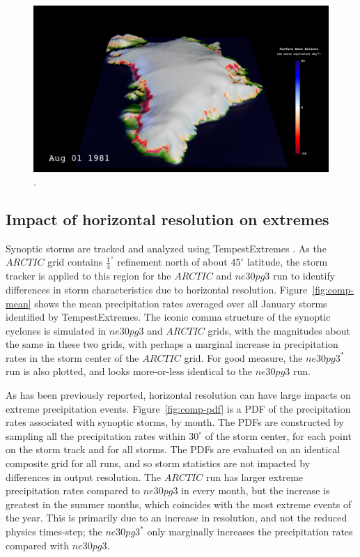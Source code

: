 \documentclass[draft]{agujournal2019}
\begin{document}
\begin{figure}[t]
\begin{center}
         \includegraphics[width=130mm]{figs/Vis1923.jpg}
\end{center}
\caption{.}
\label{fig:viz}
\end{figure}

\subsection{Impact of horizontal resolution on extremes}

Synoptic storms are tracked and analyzed using TempestExtremes \cite{UETAL2021}. As the $ARCTIC$ grid contains $\frac{1}{4}^{\circ}$ refinement north of about $45^{\circ}$ latitude, the storm tracker is applied to this region for the $ARCTIC$ and $ne30pg3$ run to identify differences in storm characteristics due to horizontal resolution. Figure~\ref{fig:comp-mean} shows the mean precipitation rates averaged over all January storms identified by TempestExtremes. The iconic comma structure of the synoptic cyclones is simulated in $ne30pg3$ and $ARCTIC$ grids, with the magnitudes about the same in these two grids, with perhaps a marginal increase in precipitation rates in the storm center of the $ARCTIC$ grid. For good measure, the $ne30pg3^{*}$ run is also plotted, and looks more-or-less identical to the $ne30pg3$ run.

As has been previously reported, horizontal resolution can have large impacts on extreme precipitation events. Figure~\ref{fig:comp-pdf} is a PDF of the precipitation rates associated with synoptic storms, by month. The PDFs are constructed by sampling all the precipitation rates within $30^{\circ}$ of the storm center, for each point on the storm track and for all storms. The PDFs are evaluated on an identical composite grid for all runs, and so storm statistics are not impacted by differences in output resolution. The $ARCTIC$ run has larger extreme precipitation rates compared to $ne30pg3$ in every month, but the increase is greatest in the summer months, which coincides with the most extreme events of the year. This is primarily due to an increase in resolution, and not the reduced physics times-step; the $ne30pg3^{*}$ only marginally increases the precipitation rates compared with $ne30pg3$.
\end{document}

